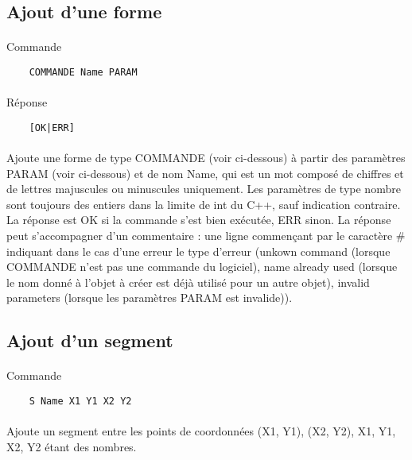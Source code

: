 \documentclass[a4paper, 12pts]{article}
\begin{document}
\subsection{Ajout d'une forme}
 \paragraph{}
Commande
\begin{lstlisting}
	COMMANDE Name PARAM
\end{lstlisting}
\paragraph{}
Réponse
\begin{lstlisting}
	[OK|ERR]
\end{lstlisting}
\paragraph{}
Ajoute une forme de type COMMANDE (voir ci-dessous) à partir des paramètres PARAM (voir ci-dessous) et de nom Name, qui est un mot composé de chiffres et de lettres majuscules ou minuscules uniquement. Les paramètres de type nombre sont toujours des entiers dans la limite de int du C++, sauf indication contraire. La réponse est OK si la commande s'est bien exécutée, ERR sinon. La réponse peut s'accompagner d'un commentaire : une ligne commençant par le caractère \# indiquant dans le cas d'une erreur le type d'erreur (unkown command (lorsque COMMANDE n'est pas une commande du logiciel), name already used (lorsque le nom donné à l'objet à créer est déjà utilisé pour un autre objet), invalid parameters (lorsque les paramètres PARAM est invalide)).

\subsection{Ajout d'un segment}
 \paragraph{}
Commande
\begin{lstlisting}
	S Name X1 Y1 X2 Y2
\end{lstlisting}
\paragraph{}
Ajoute un segment entre les points de coordonnées (X1, Y1), (X2, Y2), X1, Y1, X2, Y2 étant des nombres.
\end{document}
